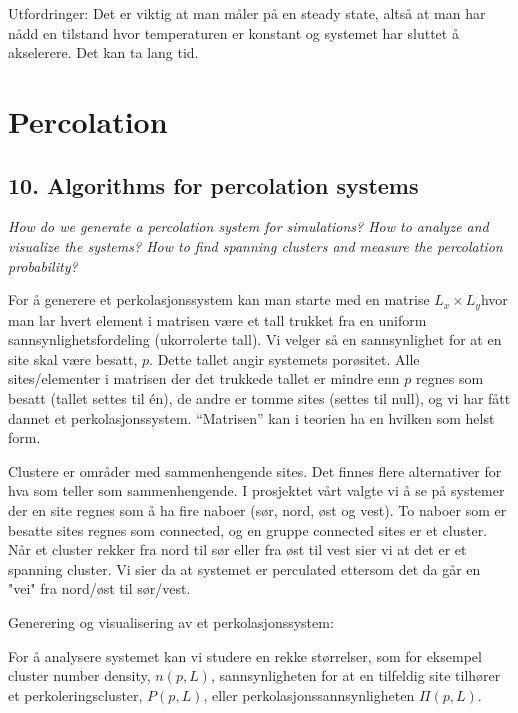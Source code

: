 \documentclass[a4paper,10pt]{article}
\begin{document}
Utfordringer: Det er viktig at man måler på en steady state, altså at man har nådd en tilstand hvor temperaturen er konstant og systemet har sluttet å akselerere. Det kan ta lang tid.


\section{Percolation}

\subsection*{10. Algorithms for percolation systems}
\textit{How do we generate a percolation system for simulations? How to analyze
and visualize the systems? How to find spanning clusters and measure the
percolation probability?}

For å generere et perkolasjonssystem kan man starte med en matrise $L_x\times L_y$hvor man lar hvert element i matrisen være et tall trukket fra en uniform sannsynlighetsfordeling (ukorrolerte tall). Vi velger så en sannsynlighet for at en site skal være besatt, $p$. Dette tallet angir systemets porøsitet. Alle sites/elementer i matrisen der det trukkede tallet er mindre enn $p$ regnes som besatt (tallet settes til én), de andre er tomme sites (settes til null), og vi har fått dannet et perkolasjonssystem. ``Matrisen'' kan i teorien ha en hvilken som helst form.  

Clustere er områder med sammenhengende sites. Det finnes flere alternativer for hva som teller som sammenhengende. I prosjektet vårt valgte vi å se på systemer der en site regnes som å ha fire naboer (sør, nord, øst og vest). To naboer som er besatte sites regnes som connected, og en gruppe connected sites er et cluster. Når et cluster rekker fra nord til sør eller fra øst til vest sier vi at det er et spanning cluster. Vi sier da at systemet er perculated ettersom det da går en "vei" fra nord/øst til sør/vest. 

Generering og visualisering av et perkolasjonssystem:

%

For å analysere systemet kan vi studere en rekke størrelser, som for eksempel cluster number density, $n(p,L)$,  sannsynligheten for at en tilfeldig site tilhører et perkoleringscluster, $P(p,L)$, eller perkolasjonssannsynligheten $\Pi(p,L)$.
% 
% 
% 
\end{document}
